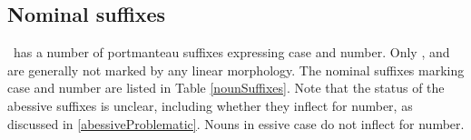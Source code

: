 \subsection{Nominal suffixes}\label{nominalSuffixes}
\PS\ has a number of portmanteau suffixes expressing case and number. 
Only ,  and  are generally %
not marked by any linear morphology. %
The nominal suffixes marking case and number are listed in Table \vref{nounSuffixes}. Note that the status of the abessive suffixes is unclear, including whether they inflect for number, as discussed in \SEC\ref{abessiveProblematic}. Nouns in essive case do not inflect for number.

